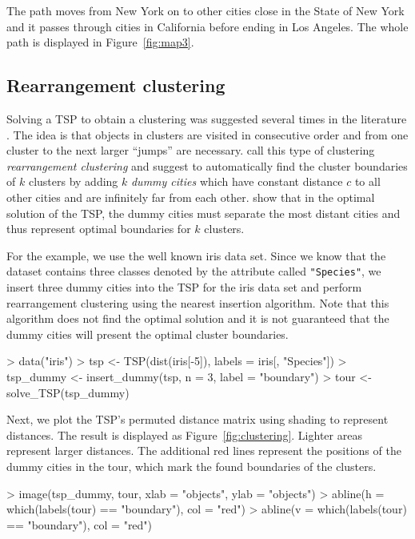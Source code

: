 \documentclass[10pt,a4paper,fleqn]{article}
\newcommand{\code}[1]{\mbox{\texttt{#1}}}
\begin{document}
The path moves from New York on to other cities close in the State of New York
and it passes through cities in California before ending in Los Angeles.
The whole path is displayed in Figure~\ref{fig:map3}. 


\subsection{Rearrangement clustering}
Solving a TSP to obtain a clustering was suggested several times in the
literature \citep[see, e.g.,][]{Lenstra1974, Alpert1997, Johnson2004}.  The idea
is that objects in clusters are visited in consecutive order and from one
cluster to the next larger ``jumps'' are necessary.  \cite{Climer2006} call
this type of clustering \emph{rearrangement clustering} and suggest to
automatically find the cluster boundaries of $k$ clusters by adding $k$
\emph{dummy cities} which have constant distance $c$ to all other cities and
are infinitely far from each other. \cite{Climer2006} show that in the optimal
solution of the TSP, the dummy cities must separate the most distant cities and
thus represent optimal boundaries for $k$ clusters.

For the example, we use the well known iris data set. Since we know that the
dataset contains three classes denoted by the attribute called \code{"Species"},
we insert three dummy cities into the TSP for the iris data set and perform
rearrangement clustering using the nearest insertion algorithm. Note that this
algorithm does not find the optimal solution and it is not guaranteed that the
dummy cities will present the optimal cluster boundaries.

\begin{Schunk}
\begin{Sinput}
> data("iris")
> tsp <- TSP(dist(iris[-5]), labels = iris[, "Species"])
> tsp_dummy <- insert_dummy(tsp, n = 3, label = "boundary")
> tour <- solve_TSP(tsp_dummy)
\end{Sinput}
\end{Schunk}

Next, we plot the TSP's permuted distance matrix using shading to
represent distances. The result is displayed as
Figure~\ref{fig:clustering}. Lighter areas represent larger
distances. The additional red lines represent the positions of the dummy
cities in the tour, which mark the found boundaries of the clusters.


\begin{Schunk}
\begin{Sinput}
> image(tsp_dummy, tour, xlab = "objects", ylab = "objects")
> abline(h = which(labels(tour) == "boundary"), col = "red")
> abline(v = which(labels(tour) == "boundary"), col = "red")
\end{Sinput}
\end{Schunk}
\end{document}
